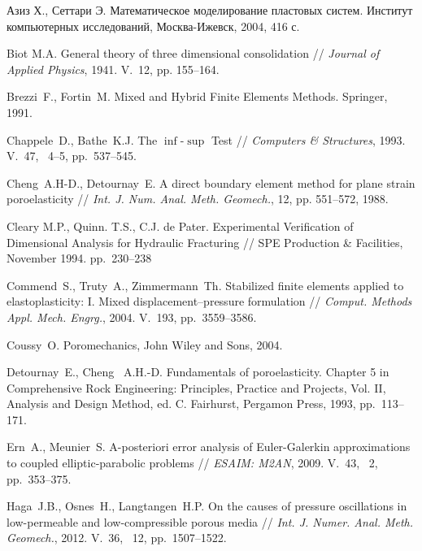 
\begin{thebibliography}{1000}


Азиз Х., Сеттари Э.  Математическое
моделирование пластовых систем.  Институт компьютерных исследований,
Москва-Ижевск, 2004, 416 с.

Biot M.A. General theory of
three dimensional consolidation // \emph{Journal of Applied Physics}, 1941. V.~12,
pp. 155--164.

Brezzi~F., Fortin~M. Mixed and Hybrid Finite Elements Methods.
Springer, 1991.

Chappele~D., Bathe~K.J.
The $\inf$-$\sup$ Test //
\emph{Computers \& Structures}, 1993.
V.~47, \No~4--5, pp.~537--545.

Cheng~A.H-D., Detournay~E. 
A direct boundary element method for plane strain
poroelasticity // \emph{Int. J. Num. Anal. Meth. Geomech.}, 12, pp. 551--572, 1988.

Cleary M.P., Quinn. T.S., C.J. de Pater.
Experimental Verification of Dimensional Analysis for Hydraulic Fracturing // 
SPE Production \& Facilities, November 1994.
pp.~230--238

Commend~S., Truty~A.,  Zimmermann~Th.
Stabilized finite elements applied to elastoplasticity: I. Mixed displacement–pressure formulation //
\emph{Comput. Methods Appl. Mech. Engrg.}, 2004.
V.~193, pp.~3559--3586.

Coussy~O. Poromechanics, John Wiley and Sons, 2004.

Detournay~E., Cheng~ A.H.-D. 
Fundamentals of poroelasticity.
Chapter 5 in Comprehensive Rock Engineering: Principles, Practice and Projects, Vol. II, Analysis and
Design Method, ed. C. Fairhurst, Pergamon Press, 1993, pp.~113--171.

Ern~A., Meunier~S.
A-posteriori error analysis of Euler-Galerkin
approximations to coupled elliptic-parabolic problems // \emph{ESAIM: M2AN}, 2009.
V.~43, \No~2, pp.~353--375.

Haga~J.B., Osnes~H., Langtangen~H.P.
On the causes of pressure oscillations in low-permeable and low-compressible porous media //
\emph{Int. J. Numer. Anal. Meth. Geomech.}, 2012.
V.~36, \No~12, pp.~1507--1522.


\end{thebibliography}
